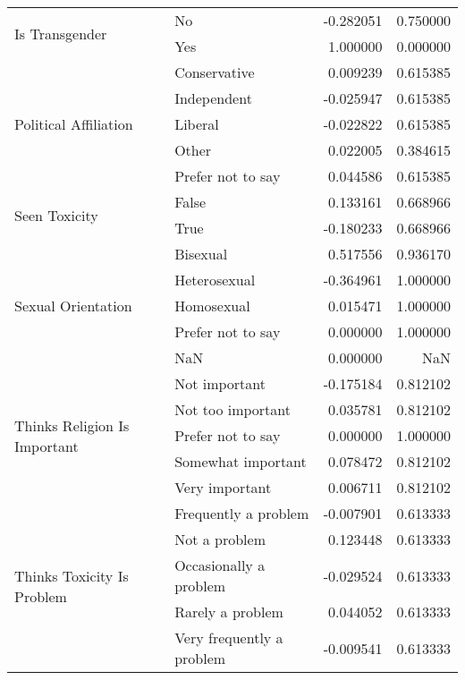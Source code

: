\begin{longtable}{llrr}
\cline{1-4}
\multirow[t]{2}{*}{Is Transgender} & No & -0.282051 & 0.750000 \\
 & Yes & 1.000000 & 0.000000 \\
\cline{1-4}
\multirow[t]{5}{*}{Political Affiliation} & Conservative & 0.009239 & 0.615385 \\
 & Independent & -0.025947 & 0.615385 \\
 & Liberal & -0.022822 & 0.615385 \\
 & Other & 0.022005 & 0.384615 \\
 & Prefer not to say & 0.044586 & 0.615385 \\
\cline{1-4}
\multirow[t]{2}{*}{Seen Toxicity} & False & 0.133161 & 0.668966 \\
 & True & -0.180233 & 0.668966 \\
\cline{1-4}
\multirow[t]{5}{*}{Sexual Orientation} & Bisexual & 0.517556 & 0.936170 \\
 & Heterosexual & -0.364961 & 1.000000 \\
 & Homosexual & 0.015471 & 1.000000 \\
 & Prefer not to say & 0.000000 & 1.000000 \\
 & NaN & 0.000000 & NaN \\
\cline{1-4}
\multirow[t]{5}{*}{Thinks Religion Is Important} & Not important & -0.175184 & 0.812102 \\
 & Not too important & 0.035781 & 0.812102 \\
 & Prefer not to say & 0.000000 & 1.000000 \\
 & Somewhat important & 0.078472 & 0.812102 \\
 & Very important & 0.006711 & 0.812102 \\
\cline{1-4}
\multirow[t]{5}{*}{Thinks Toxicity Is Problem} & Frequently a problem & -0.007901 & 0.613333 \\
 & Not a problem & 0.123448 & 0.613333 \\
 & Occasionally a problem & -0.029524 & 0.613333 \\
 & Rarely a problem & 0.044052 & 0.613333 \\
 & Very frequently a problem & -0.009541 & 0.613333 \\
\cline{1-4}
\end{longtable}
